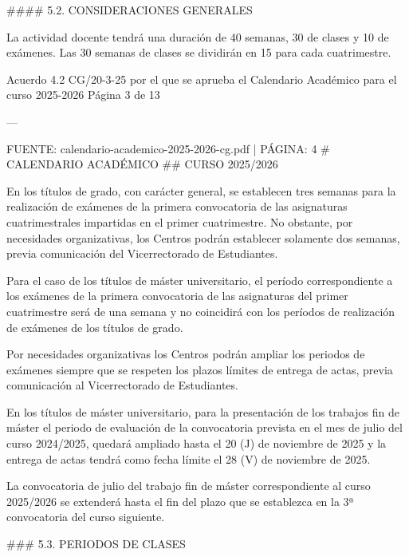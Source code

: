 \documentclass{article}
\begin{document}
\begin{itemize}
\begin{itemize}
\begin{scriptsize}
                  \#\#\#\# 5.2. CONSIDERACIONES GENERALES

                  La actividad docente tendrá una duración de 40 semanas, 30 de clases y 10 de exámenes. Las 30 semanas de clases se dividirán en 15 para cada cuatrimestre.

                  Acuerdo 4.2 CG/20-3-25 por el que se aprueba el Calendario Académico para el curso 2025-2026  Página 3 de 13

                  ---

                  FUENTE: calendario-academico-2025-2026-cg.pdf | PÁGINA: 4
                  \# CALENDARIO ACADÉMICO
                  \#\# CURSO 2025/2026

                  En los títulos de grado, con carácter general, se establecen tres semanas para la realización de exámenes de la primera convocatoria de las asignaturas cuatrimestrales impartidas en el primer cuatrimestre. No obstante, por necesidades organizativas, los Centros podrán establecer solamente dos semanas, previa comunicación del Vicerrectorado de Estudiantes.

                  Para el caso de los títulos de máster universitario, el período correspondiente a los exámenes de la primera convocatoria de las asignaturas del primer cuatrimestre será de una semana y no coincidirá con los períodos de realización de exámenes de los títulos de grado.

                  Por necesidades organizativas los Centros podrán ampliar los periodos de exámenes siempre que se respeten los plazos límites de entrega de actas, previa comunicación al Vicerrectorado de Estudiantes.

                  En los títulos de máster universitario, para la presentación de los trabajos fin de máster el periodo de evaluación de la convocatoria prevista en el mes de julio del curso 2024/2025, quedará ampliado hasta el 20 (J) de noviembre de 2025 y la entrega de actas tendrá como fecha límite el 28 (V) de noviembre de 2025.

                  La convocatoria de julio del trabajo fin de máster correspondiente al curso 2025/2026 se extenderá hasta el fin del plazo que se establezca en la 3ª convocatoria del curso siguiente.

                  \#\#\# 5.3. PERIODOS DE CLASES


\end{scriptsize}
\end{itemize}
\end{itemize}
\end{document}
